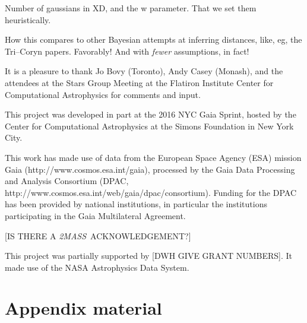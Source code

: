 \documentclass[12pt, preprint]{aastex6}
\newcommand{\acronym}[1]{{\small{#1}}}
\newcommand{\project}[1]{\textsl{#1}}
\newcommand{\tmass}{\project{\acronym{2MASS}}}
\newcommand{\xd}{\acronym{XD}}
\begin{document}
Number of gaussians in \xd, and the w parameter. That we set them heuristically.

How this compares to other Bayesian attempts at inferring distances,
like, eg, the Tri--Coryn papers. Favorably! And with \emph{fewer}
assumptions, in fact!

\acknowledgments It is a pleasure to thank
  Jo Bovy (Toronto),
  Andy Casey (Monash),
and the attendees at the Stars Group Meeting at the Flatiron Institute
Center for Computational Astrophysics for comments and input.

This project was developed in part at the 2016 \acronym{NYC} Gaia Sprint, hosted
by the Center for Computational Astrophysics at the Simons Foundation
in New York City.

This work has made use of data from the European Space Agency (\acronym{ESA})
mission Gaia (http://www.cosmos.esa.int/gaia), processed by the Gaia
Data Processing and Analysis Consortium (\acronym{DPAC},
http://www.cosmos.esa.int/web/gaia/dpac/consortium). Funding for the
\acronym{DPAC} has been provided by national institutions, in particular the
institutions participating in the Gaia Multilateral Agreement.

[IS THERE A \tmass\ ACKNOWLEDGEMENT?]

This project was partially supported by [DWH GIVE GRANT NUMBERS]. It
made use of the \acronym{NASA} Astrophysics Data System.

\appendix

\section{Appendix material}



\clearpage
\end{document}
